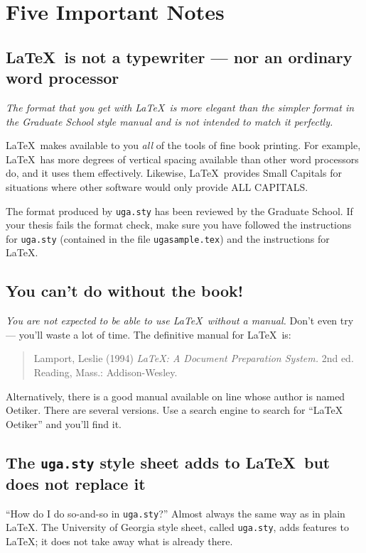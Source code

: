 \documentclass[12pt]{report}
\begin{document}
\chapter{Five Important Notes}

\section{\LaTeX\ is not a typewriter --- nor an ordinary word processor}

\emph{The format that you get with \LaTeX\ is more elegant
than the simpler format in the Graduate School style manual and is not
intended to match it perfectly.}

\LaTeX\ makes available to you \emph{all} of the tools of fine book printing.
For example, \LaTeX\ has more degrees of
vertical spacing available than other word processors do, and it uses them
effectively.  Likewise, \LaTeX\ provides {\sc Small Capitals} for situations
where other software would only provide ALL CAPITALS.

The format produced by \verb"uga.sty" has been reviewed by the Graduate School.
If your thesis fails the format check, make sure you have followed the instructions
for \verb"uga.sty" (contained in the file \verb"ugasample.tex") and the
instructions for \LaTeX.

\section{You can't do without the book!}

\emph{You are not expected to be able to use \LaTeX\ without a manual.}
Don't even try --- you'll waste a lot of time.
The definitive manual for \LaTeX\ is:
\begin{quote}
Lamport, Leslie (1994) \emph{\LaTeX: A Document Preparation System.}
2nd ed.
Reading, Mass.: Addison-Wesley.
\end{quote}
Alternatively, there is a good manual available on line whose author is named Oetiker.
There are several versions.  Use a search engine to search for ``LaTeX Oetiker'' and
you'll find it.

\section{The {\tt uga.sty} style sheet adds to \LaTeX\ but does not replace it}

``How do I do so-and-so in \verb"uga.sty"?''  Almost always the same way as in plain \LaTeX.
The University of Georgia style sheet, called \verb"uga.sty", adds features to \LaTeX; it
does not take away what is already there.
\end{document}
